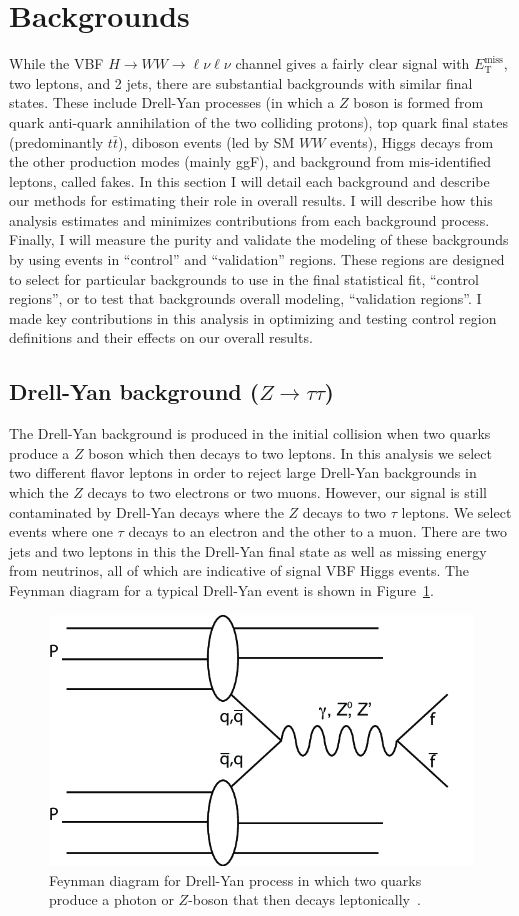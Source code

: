 \section{Backgrounds}
While the VBF $H\rightarrow WW\rightarrow \ell\nu\ell\nu$ channel gives a fairly clear signal with $E_{\text{T}}^{\text{miss}}$, two leptons, and 2 jets, there are substantial backgrounds with similar final states. These include Drell-Yan processes (in which a $Z$ boson is formed from quark anti-quark annihilation of the two colliding protons), top quark final states (predominantly $t\bar{t}$), diboson events (led by SM $WW$ events), Higgs decays from the other production modes (mainly ggF), and background from mis-identified leptons, called fakes. In this section I will detail each background and describe our methods for estimating their role in overall results. I will describe how this analysis estimates and minimizes contributions from each background process. Finally, I will measure the purity and validate the modeling of these backgrounds by using events in ``control'' and ``validation'' regions. These regions are designed to select for particular backgrounds to use in the final statistical fit, ``control regions'', or to test that backgrounds overall modeling, ``validation regions''.  I made key contributions in this analysis in optimizing and testing control region definitions and their effects on our overall results. 

\subsection{Drell-Yan background ($Z\rightarrow \tau\tau$)}
The Drell-Yan background is produced in the initial collision when two quarks produce a $Z$ boson which then decays to two leptons. In this analysis we select two different flavor leptons in order to reject large Drell-Yan backgrounds in which the $Z$ decays to two electrons or two muons. However, our signal is still contaminated by Drell-Yan decays where the $Z$ decays to two $\tau$ leptons. We select events where one $\tau$ decays to an electron and the other to a muon. There are two jets and two leptons in this the Drell-Yan final state as well as missing energy from neutrinos, all of which are indicative of signal VBF Higgs events. The Feynman diagram for a typical Drell-Yan event is shown in Figure~\ref{fig:DrellYan}. 

\begin{figure}
\centering
  \includegraphics[width=.35\linewidth]{Pictures/FeynmanDrellYan.png}
\caption{Feynman diagram for Drell-Yan process in which two quarks produce a photon or $Z$-boson that then decays leptonically~\cite{DrellYan}.}
\label{fig:DrellYan}
\end{figure}

